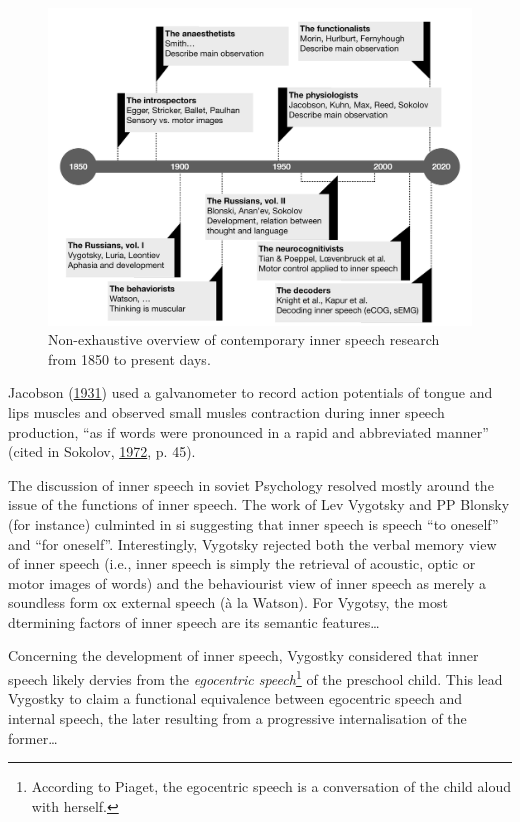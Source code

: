 \documentclass[a4paper,12pt,twoside,openright,oldfontcommands]{memoir}
\let\rmarkdownfootnote\footnote%
\def\footnote{\protect\rmarkdownfootnote}
\begin{document}
\begin{figure}[H]

{\centering \includegraphics[width=1\linewidth]{assets/timeline} 

}

\caption{Non-exhaustive overview of contemporary inner speech research from 1850 to present days.}\label{fig:timeline}
\end{figure}

Jacobson (\protect\hyperlink{ref-jacobson_electrical_1931}{1931}) used a galvanometer to record action potentials of tongue and lips muscles and observed small musles contraction during inner speech production, \enquote{as if words were pronounced in a rapid and abbreviated manner} (cited in Sokolov, \protect\hyperlink{ref-sokolov_inner_1972}{1972}, p. 45).

The discussion of inner speech in soviet Psychology resolved mostly around the issue of the functions of inner speech. The work of Lev Vygotsky and PP Blonsky (for instance) culminted in si suggesting that inner speech is speech \enquote{to oneself} and \enquote{for oneself}. Interestingly, Vygotsky rejected both the verbal memory view of inner speech (i.e., inner speech is simply the retrieval of acoustic, optic or motor images of words) and the behaviourist view of inner speech as merely a soundless form ox external speech (à la Watson). For Vygotsy, the most dtermining factors of inner speech are its semantic features\ldots{}

Concerning the development of inner speech, Vygostky considered that inner speech likely dervies from the \emph{egocentric speech}\footnote{According to Piaget, the egocentric speech is a conversation of the child aloud with herself.} of the preschool child. This lead Vygostky to claim a functional equivalence between egocentric speech and internal speech, the later resulting from a progressive internalisation of the former\ldots{}
\end{document}

